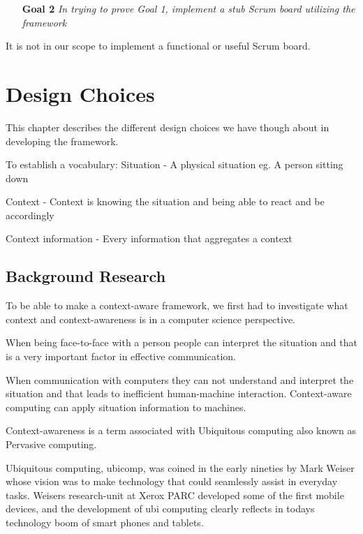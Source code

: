 \documentclass[]{report}
\begin{document}
\begin{itemize}
\item[\textbf{Goal 2 }] \textit{In trying to prove Goal 1, implement a stub Scrum board utilizing the framework}
\end{itemize}

It is not in our scope to implement a functional or useful Scrum board.











  

\chapter{Design Choices}

This chapter describes the different design choices we have though about in developing the framework.

To establish a vocabulary:
	Situation - A physical situation eg. A person sitting down

	Context - Context is knowing the situation and being able to react and be accordingly

	Context information - Every information that aggregates a context


\section{Background Research}
To be able to make a context-aware framework, we first had to investigate what context and context-awareness is in a computer science perspective.


When being face-to-face with a person people can interpret the situation and that is a very important factor in effective communication. 

When communication with computers they can not understand and interpret the situation and that leads to inefficient human-machine interaction. Context-aware computing can apply situation information to machines.

Context-awareness is a term associated with Ubiquitous computing also known as Pervasive computing.

Ubiquitous computing, ubicomp, was coined in the early nineties by Mark Weiser whose vision was to make technology that could seamlessly assist in everyday tasks. Weisers research-unit at Xerox PARC developed some of the first mobile devices, and the development of ubi computing clearly reflects in todays technology boom of smart phones and tablets.
\end{document}
